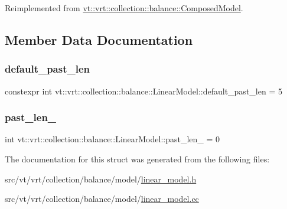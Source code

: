Reimplemented from \hyperlink{classvt_1_1vrt_1_1collection_1_1balance_1_1_composed_model_a5de9a43648cfd18ca00f1f0a6c61be4d}{vt\+::vrt\+::collection\+::balance\+::\+Composed\+Model}.



\subsection{Member Data Documentation}
\mbox{\label{structvt_1_1vrt_1_1collection_1_1balance_1_1_linear_model_a17d295e933227905ba94ea69f1cbfb64}} 
\subsubsection{\texorpdfstring{default\+\_\+past\+\_\+len}{default\_past\_len}}
{\footnotesize\ttfamily constexpr int vt\+::vrt\+::collection\+::balance\+::\+Linear\+Model\+::default\+\_\+past\+\_\+len = 5\hspace{0.3cm}{\ttfamily [static]}}

\mbox{\label{structvt_1_1vrt_1_1collection_1_1balance_1_1_linear_model_a1fb9ade3b0967df8c59770d53d0b8f97}} 
\subsubsection{\texorpdfstring{past\+\_\+len\+\_\+}{past\_len\_}}
{\footnotesize\ttfamily int vt\+::vrt\+::collection\+::balance\+::\+Linear\+Model\+::past\+\_\+len\+\_\+ = 0\hspace{0.3cm}{\ttfamily [private]}}



The documentation for this struct was generated from the following files\+:\begin{DoxyCompactItemize}
\item 
src/vt/vrt/collection/balance/model/\hyperlink{linear__model_8h}{linear\+\_\+model.\+h}\item 
src/vt/vrt/collection/balance/model/\hyperlink{linear__model_8cc}{linear\+\_\+model.\+cc}\end{DoxyCompactItemize}
